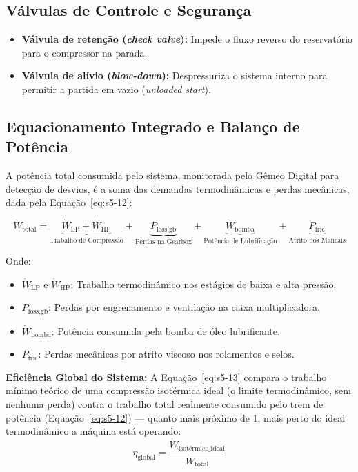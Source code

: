 \documentclass[12pt,a4paper]{article}
\numberwithin{equation}{section}
\numberwithin{table}{section}
\numberwithin{figure}{section}
\begin{document}
{	\subsection{\textbf{Válvulas de Controle e Segurança}}
	\begin{itemize}
		\item \textbf{Válvula de retenção (\textit{check valve}):} Impede o fluxo reverso do reservatório para o compressor na parada.
		\item \textbf{Válvula de alívio (\textit{blow-down}):} Despressuriza o sistema interno para permitir a partida em vazio (\textit{unloaded start}).
	\end{itemize}
	
	\subsection{\textbf{Equacionamento Integrado e Balanço de Potência}}
	A potência total consumida pelo sistema, monitorada pelo Gêmeo Digital para detecção de desvios, é a soma das demandas termodinâmicas e perdas mecânicas, dada pela Equação~\eqref{eq:s5-12}:

	\begin{equation}\label{eq:s5-12}
	\dot{W}_{\text{total}} = \underbrace{\dot{W}_{\text{LP}} + \dot{W}_{\text{HP}}}_{\text{Trabalho de Compressão}} + \underbrace{P_{\text{loss,gb}}}_{\text{Perdas na Gearbox}} + \underbrace{\dot{W}_{\text{bomba}}}_{\text{Potência de Lubrificação}} + \underbrace{P_{\text{fric}}}_{\text{Atrito nos Mancais}}
\end{equation}
	
	Onde:
	\begin{itemize}
		\item $\dot{W}_{\text{LP}}$ e $\dot{W}_{\text{HP}}$: Trabalho termodinâmico nos estágios de baixa e alta pressão.
		\item $P_{\text{loss,gb}}$: Perdas por engrenamento e ventilação na caixa multiplicadora.
		\item $\dot{W}_{\text{bomba}}$: Potência consumida pela bomba de óleo lubrificante.
		\item $P_{\text{fric}}$: Perdas mecânicas por atrito viscoso nos rolamentos e selos.
	\end{itemize}
	
	\vspace{1em}
	\textbf{Eficiência Global do Sistema:} A Equação~\eqref{eq:s5-13} compara o trabalho mínimo teórico de uma compressão isotérmica ideal (o limite termodinâmico, sem nenhuma perda) contra o trabalho total realmente consumido pelo trem de potência (Equação~\eqref{eq:s5-12}) — quanto mais próximo de 1, mais perto do ideal termodinâmico a máquina está operando:
	\begin{equation}\label{eq:s5-13}
 \eta_{\text{global}} = \frac{\dot{W}_{\text{isotérmico\_ideal}}}{\dot{W}_{\text{total}}}
\end{equation}

}
\end{document}

